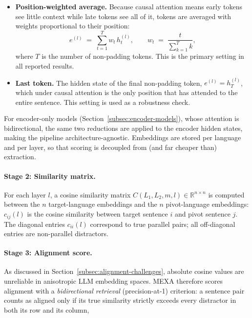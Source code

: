\begin{itemize}
    \item \textbf{Position-weighted average.} Because causal attention
    means early tokens see little context while late tokens see all of it,
    tokens are averaged with weights proportional to their position:
    \begin{equation}
        e^{(l)} \;=\; \sum_{t=1}^{T} w_t\, h_t^{(l)},
        \qquad
        w_t \;=\; \frac{t}{\sum_{k=1}^{T} k},
        \label{eq:weighted-avg}
    \end{equation}
    where $T$ is the number of non-padding tokens. This is the primary
    setting in all reported results.
    \item \textbf{Last token.} The hidden state of the final non-padding
    token, $e^{(l)} = h_T^{(l)}$, which under causal attention is the only
    position that has attended to the entire sentence. This setting is
    used as a robustness check.
\end{itemize}

For encoder-only models (Section~\ref{subsec:encoder-models}), whose
attention is bidirectional, the same two reductions are applied to the
encoder hidden states, making the pipeline architecture-agnostic.
Embeddings are stored per language and per layer, so that scoring is
decoupled from (and far cheaper than) extraction.

\paragraph{Stage 2: Similarity matrix.}
For each layer $l$, a cosine similarity matrix
$C(L_1, L_2, m, l) \in \mathbb{R}^{n \times n}$ is computed between the
$n$ target-language embeddings and the $n$ pivot-language embeddings:
$c_{ij}(l)$ is the cosine similarity between target sentence $i$ and pivot
sentence $j$. The diagonal entries $c_{ii}(l)$ correspond to true parallel
pairs; all off-diagonal entries are non-parallel distractors.

\paragraph{Stage 3: Alignment score.}
As discussed in Section~\ref{subsec:alignment-challenges}, absolute cosine
values are unreliable in anisotropic LLM embedding spaces. MEXA therefore
scores alignment with a \emph{bidirectional retrieval} (precision-at-1)
criterion: a sentence pair counts as aligned only if its true similarity
strictly exceeds every distractor in both its row and its column,

